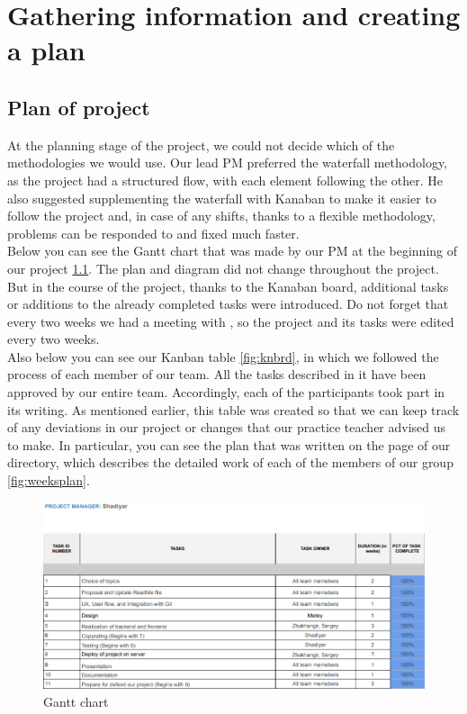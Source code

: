 \chapter{Gathering information and creating a plan}\label{ch:A}
\section{Plan of project}
At the planning stage of the project, we could not decide which of the methodologies we would use. Our lead PM preferred the waterfall methodology, as the project had a structured flow, with each element following the other. He also suggested supplementing the waterfall with Kanaban to make it easier to follow the project and, in case of any shifts, thanks to a flexible methodology, problems can be responded to and fixed much faster.
\\
Below you can see the Gantt chart that was made by our PM at the beginning of our project \ref{fig:plan1}. The plan and diagram did not change throughout the project. But in the course of the project, thanks to the Kanaban board, additional tasks or additions to the already completed tasks were introduced. Do not forget that every two weeks we had a meeting with {\mycoach}, so the project and its tasks were edited every two weeks.
\\
Also below you can see our Kanban table \ref{fig:knbrd}, in which we followed the process of each member of our team. All the tasks described in it have been approved by our entire team. Accordingly, each of the participants took part in its writing. As mentioned earlier, this table was created so that we can keep track of any deviations in our project or changes that our practice teacher {\mycoach} advised us to make. In particular, you can see the plan that was written on the page of our directory, which describes the detailed work of each of the members of our group \ref{fig:weeksplan}.

\begin{figure}[ht]
    \centering
    \includegraphics[scale=0.5]{plan1.png}
    \caption{Gantt chart}
    \label{fig:plan1}
\end{figure}

